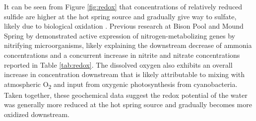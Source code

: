 It can be seen from Figure \ref{fig:redox} that concentrations of relatively reduced sulfide are higher at the hot spring source and gradually give way to sulfate, likely due to biological oxidation \citep{cox2011transition}. Previous research at Bison Pool and Mound Spring by \cite{loiacono2012evidence} demonstrated active expression of nitrogen-metabolizing genes by nitrifying microorganisms, likely explaining the downstream decrease of ammonia concentrations and a concurrent increase in nitrite and nitrate concentrations reported in Table \ref{tab:redox}. The dissolved oxygen also exhibits an overall increase in concentration downstream that is likely attributable to mixing with atmospheric O\textsubscript{2} and input from oxygenic photosynthesis from cyanobacteria. Taken together, these geochemical data suggest the redox potential of the water was generally more reduced at the hot spring source and gradually becomes more oxidized downstream.


